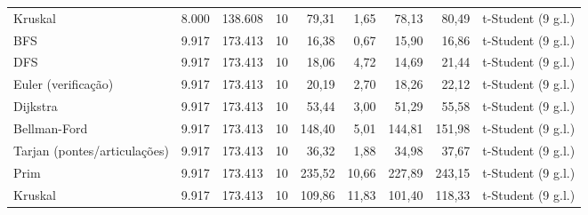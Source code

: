 \begin{table}[ht]
\begin{tabular}{lrrrrrrrl}
Kruskal & 8.000 & 138.608 & 10 & 79,31 & 1,65 & 78,13 & 80,49 & t-Student (9 g.l.) \\
BFS & 9.917 & 173.413 & 10 & 16,38 & 0,67 & 15,90 & 16,86 & t-Student (9 g.l.) \\
DFS & 9.917 & 173.413 & 10 & 18,06 & 4,72 & 14,69 & 21,44 & t-Student (9 g.l.) \\
Euler (verificação) & 9.917 & 173.413 & 10 & 20,19 & 2,70 & 18,26 & 22,12 & t-Student (9 g.l.) \\
Dijkstra & 9.917 & 173.413 & 10 & 53,44 & 3,00 & 51,29 & 55,58 & t-Student (9 g.l.) \\
Bellman-Ford & 9.917 & 173.413 & 10 & 148,40 & 5,01 & 144,81 & 151,98 & t-Student (9 g.l.) \\
Tarjan (pontes/articulações) & 9.917 & 173.413 & 10 & 36,32 & 1,88 & 34,98 & 37,67 & t-Student (9 g.l.) \\
Prim & 9.917 & 173.413 & 10 & 235,52 & 10,66 & 227,89 & 243,15 & t-Student (9 g.l.) \\
Kruskal & 9.917 & 173.413 & 10 & 109,86 & 11,83 & 101,40 & 118,33 & t-Student (9 g.l.) \\
\hline
\end{tabular}
\end{table}
